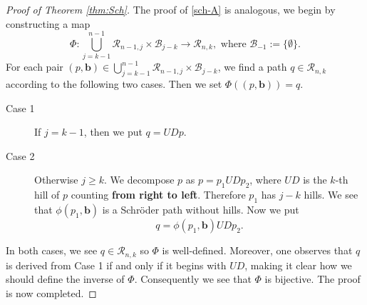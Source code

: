 \documentclass[11pt,reqno]{amsart}
\numberwithin{equation}{section}
\theoremstyle{plain}
\theoremstyle{definition}
\newcommand{\R}{\mathcal{R}}
\newcommand{\B}{\mathcal{B}}
\begin{document}
\begin{proof}[Proof of Theorem \ref{thm:Sch}]
The proof of \eqref{sch-A} is analogous, we begin by constructing a map
$$\Phi:\bigcup_{j=k-1}^{n-1}\R_{n-1,j}\times\B_{j-k}\rightarrow \R_{n,k}, \text{ where }\B_{-1}:=\{\emptyset\}.$$
For each pair $(p,\mathbf{b})\in\bigcup_{j=k-1}^{n-1}\R_{n-1,j}\times\B_{j-k}$, we find a path $q\in\R_{n,k}$ according to the following two cases. Then we set $\Phi((p,\mathbf{b}))=q$.
\begin{description}
\item[Case 1] If $j=k-1$, then we put $q=UDp$.
\item[Case 2] Otherwise $j\ge k$. We decompose $p$ as $p=p_1UDp_2$, where $UD$ is the $k$-th hill of $p$ counting {\bf from right to left}. Therefore $p_1$ has $j-k$ hills. We see that $\phi(p_1,\mathbf{b})$ is a Schr\"oder path without hills. Now we put $$q=\phi(p_1,\mathbf{b})UDp_2.$$
\end{description}
In both cases, we see $q\in\R_{n,k}$ so $\Phi$ is well-defined. Moreover, one observes that $q$ is derived from Case 1 if and only if it begins with $UD$, making it clear how we should define the inverse of $\Phi$. Consequently we see that $\Phi$ is bijective. The proof is now completed.
\end{proof}
\end{document}
